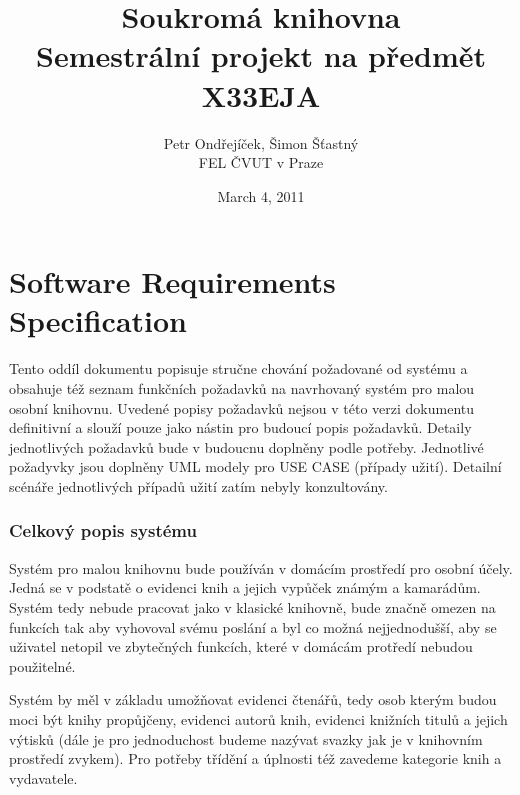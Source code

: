 \documentclass{article}
\title{Soukromá knihovna\\
 Semestrální projekt na předmět X33EJA}
\date{March 4, 2011}
\author{Petr Ondřejíček, Šimon Šťastný\\
FEL ČVUT v Praze}
\begin{document}
\begin{titlepage}
  \maketitle
  \thispagestyle{empty}
\end{titlepage}


\newpage

\part{Software Requirements Specification}

\vspace{10mm}
\smallskip

\indent \par Tento oddíl dokumentu popisuje stručne chování požadované od
systému a obsahuje též seznam funkčních požadavků na navrhovaný systém pro malou
osobní knihovnu. Uvedené popisy požadavků nejsou v této verzi dokumentu definitivní a slouží pouze jako nástin pro budoucí popis požadavků. Detaily jednotlivých požadavků
bude v budoucnu doplněny podle potřeby. Jednotlivé požadyvky jsou doplněny UML
modely pro USE CASE (případy užití). Detailní scénáře jednotlivých případů užití
zatím nebyly konzultovány.


\newpage

\section{Celkový popis systému}
\indent \par Systém pro malou knihovnu bude používán v domácím prostředí pro
osobní účely. Jedná se v podstatě o evidenci knih a jejich vypůček známým a kamarádům. Systém
tedy nebude pracovat jako v klasické knihovně, bude značně omezen na funkcích
tak aby vyhovoval svému poslání a byl co možná nejjednodušší, aby se uživatel
netopil ve zbytečných funkcích, které v domácám protředí nebudou použitelné.

\bigskip

Systém by měl v základu umožňovat evidenci čtenářů, tedy osob kterým budou moci
být knihy propůjčeny, evidenci autorů knih, evidenci knižních titulů a jejich
výtisků (dále je pro jednoduchost budeme nazývat svazky jak je v knihovním
prostředí zvykem). Pro potřeby třídění a úplnosti též zavedeme kategorie knih a
vydavatele.

\bigskip
\end{document}
